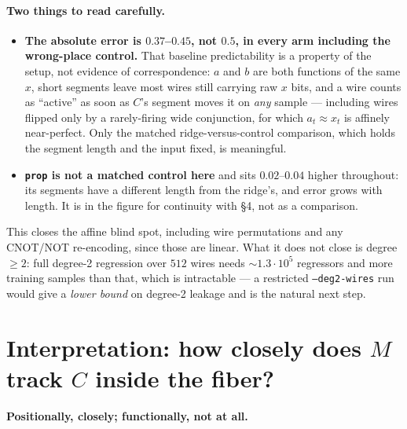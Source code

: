 \documentclass[11pt]{article}
\newcommand{\code}[1]{\texttt{#1}}
\begin{document}
\paragraph{Two things to read carefully.}
\begin{itemize}
\item \textbf{The absolute error is $0.37$--$0.45$, not $0.5$, in every arm including the wrong-place
control.} That baseline predictability is a property of the setup, not evidence of correspondence: $a$
and $b$ are both functions of the same $x$, short segments leave most wires still carrying raw $x$ bits,
and a wire counts as ``active'' as soon as $C$'s segment moves it on \emph{any} sample --- including
wires flipped only by a rarely-firing wide conjunction, for which $a_t\approx x_t$ is affinely
near-perfect. Only the matched ridge-versus-control comparison, which holds the segment length and the
input fixed, is meaningful.
\item \textbf{\code{prop} is not a matched control here} and sits $0.02$--$0.04$ higher throughout: its
segments have a different length from the ridge's, and error grows with length. It is in the figure for
continuity with §4, not as a comparison.
\end{itemize}

This closes the affine blind spot, including wire permutations and any CNOT/NOT re-encoding, since those
are linear. What it does not close is degree $\ge 2$: full degree-2 regression over $512$ wires needs
${\sim}1.3\cdot10^5$ regressors and more training samples than that, which is intractable --- a
restricted \code{--deg2-wires} run would give a \emph{lower bound} on degree-2 leakage and is the natural
next step.


\section{Interpretation: how closely does $M$ track $C$ inside the fiber?}

\textbf{Positionally, closely; functionally, not at all.}
\end{document}
